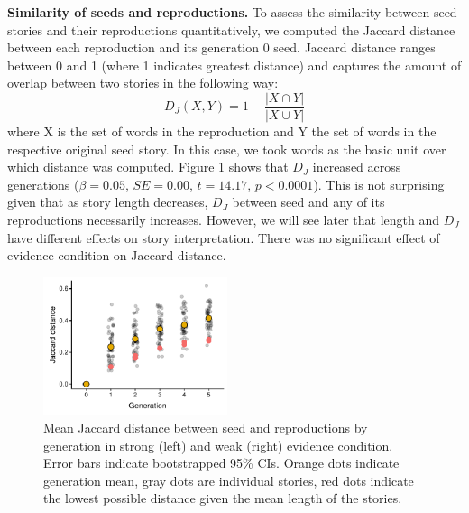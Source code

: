 \documentclass[10pt,letterpaper]{article}
\newcommand{\ek}[1]{\textcolor{Orange}{[ek: #1]}}
\newcommand{\mf}[1]{\textcolor{PinkyPurple}{[mf: #1]}}
\begin{document}
\textbf{Similarity of seeds and reproductions.} %
To assess the similarity between seed stories and their reproductions quantitatively, we computed the Jaccard distance between each reproduction and its generation 0 seed. Jaccard distance ranges between 0 and 1 (where 1 indicates greatest distance) and captures the amount of overlap between two stories in the following way: \[D_J(X,Y) = 1 - \frac{|X \cap Y|}{|X \cup Y|}\] where X is the set of words in the reproduction and Y the set of words in the respective original seed story. In this case, we took words as the basic unit over which distance was computed. Figure \ref{fig:jaccdistance} shows that $D_J$ increased across generations ($\beta = 0.05$, $SE = 0.00$, $t = 14.17$, $p < 0.0001$). This is not surprising given that as story length decreases, $D_J$ between seed and any of its reproductions necessarily increases. However, we will see later that length and $D_J$ have different effects on story interpretation. There was no significant effect of evidence condition on Jaccard distance. %

\begin{figure}[]
	\includegraphics[width=0.48\textwidth]{pics/jaccdistance.pdf}
	\caption{Mean Jaccard distance between seed and reproductions by generation in strong (left) and weak (right) evidence condition. Error bars indicate bootstrapped 95\% CIs. Orange dots indicate generation mean, gray dots are individual stories, red dots indicate the lowest possible distance given the mean length of the stories.} 
	\label{fig:jaccdistance}
\end{figure}
\end{document}
